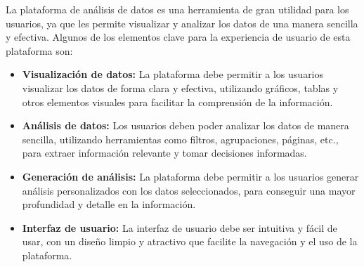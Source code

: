 La plataforma de análisis de datos es una herramienta de gran utilidad para los usuarios, ya que les permite
visualizar y analizar los datos de una manera sencilla y efectiva. Algunos de los elementos clave para la
experiencia de usuario de esta plataforma son:

\begin{itemize}
    \item \textbf{Visualización de datos:} La plataforma debe permitir a los usuarios visualizar los datos de forma clara y efectiva, utilizando gráficos, tablas y otros elementos visuales para facilitar la comprensión de la información.
    \item \textbf{Análisis de datos:} Los usuarios deben poder analizar los datos de manera sencilla, utilizando herramientas como filtros, agrupaciones, páginas, etc., para extraer información relevante y tomar decisiones informadas.
    \item \textbf{Generación de análisis:} La plataforma debe permitir a los usuarios generar análisis personalizados con los datos seleccionados, para conseguir una mayor profundidad y detalle en la información.
    \item \textbf{Interfaz de usuario:} La interfaz de usuario debe ser intuitiva y fácil de usar, con un diseño limpio y atractivo que facilite la navegación y el uso de la plataforma.
\end{itemize}
